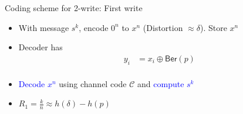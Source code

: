 \documentclass{beamer}
\newlength{\twocolwid}
\newlength{\itemspace}
\begin{document}
\begin{frame}
\begin{columns}[t]
  \begin{column}{\twocolwid}
    \vspace{0.25cm}
    \begin{block}{Coding scheme for 2-write: First write}

    \begin{itemize}
    \item With message $s^k$, encode $0^n$ to $x^n$ (Distortion $\approx \delta$). Store $x^n$
    \item\vspace{\itemspace} Decoder has
      \small{
        \begin{align*}
          y_i&=x_i \oplus \mathsf{Ber}(p) \\
        \end{align*}
      }
    \vspace{-1.25cm}
    \item \vspace{\itemspace}\textcolor{blue}{Decode $x^n$} using channel code $\mathcal{C}$ and \textcolor{blue}{compute $s^k$}
          \begin{center}
		      \scalebox{1.5}{}
		    \end{center}
    \item \vspace{\itemspace} $R_1=\tfrac{k}{n}\approx h(\delta)-h(p)$
    \end{itemize}
    \end{block}




\end{column}
\end{columns}
\end{frame}
\end{document}
